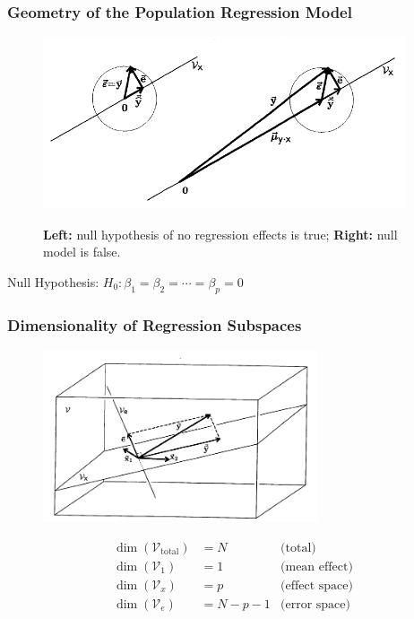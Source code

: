 \documentclass{beamer}
\begin{document}
\begin{frame}
  \frametitle{Geometry of the Population Regression Model}

  
\begin{figure}
{\centering \includegraphics[height=2in]{regr-error-model2.pdf}}
\caption{\textbf{Left:} null hypothesis of no regression effects is true; \textbf{Right:} null model is false.}
\end{figure}

\begin{center}
\alert{Null Hypothesis: }  $H_0: \beta_1 = \beta_2 = \cdots = \beta_p = 0$
\end{center}

\end{frame}


\begin{frame}
  \frametitle{Dimensionality of Regression Subspaces}

  
\begin{figure}
{\centering \includegraphics[height=2in]{regr-dimofspaces.pdf}}
\end{figure}
%
\begin{align*}
  \dim(\mathcal{V}_\text{total}) & = N &\text{(total)}\\
  \dim(\mathcal{V}_1) & = 1 &\text{(mean effect)} \\
  \dim(\mathcal{V}_x) & = p &\text{(effect space)}\\
  \dim(\mathcal{V}_e) & = N - p - 1 &\text{(error space)}
\end{align*}

\end{frame}
\end{document}
